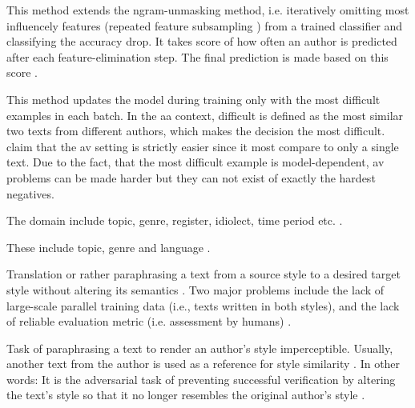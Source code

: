 \begin{definition}
    This method extends the ngram-unmasking method, i.e. iteratively omitting most influencely features (repeated feature subsampling \cite{koppel_determining_2014})
    from a trained classifier and classifying the accuracy drop.
    It takes score of how often an author is predicted after each feature-elimination step.
    The final prediction is made based on this score \cite{tyo_state_2022}.
\end{definition}


\begin{definition}
    This method updates the model during training only with the most difficult examples in each batch.
    In the \ac{aa} context, difficult is defined as the most similar two texts from different authors, 
    which makes the decision the most difficult.
    \citet{tyo_state_2022} claim that the \ac{av} setting is strictly easier since 
    it most compare to only a single text.
    Due to the fact, that the most difficult example is model-dependent, \ac{av} problems can be made harder 
    but they can not exist of exactly the hardest negatives.
\end{definition}

\begin{definition}
    [Domain]
    The domain include topic, genre, register, idiolect, time period etc. \cite{bischoff_importance_2020}.
\end{definition}
  
\begin{definition}
    These include topic, genre and language \cite{bischoff_importance_2020}.
\end{definition}

\begin{definition}
    Translation or rather paraphrasing a text from a source style to a desired target style \cite{bischoff_importance_2020} without altering its semantics \cite{gohsen_task_oriented_2024}.
    Two major problems include the lack of large-scale parallel training data (i.e., texts written in both styles), 
    and the lack of reliable evaluation metric (i.e. assessment by humans) \cite{bischoff_importance_2020}.
\end{definition}

\begin{definition}
    Task of paraphrasing a text to render an author's style imperceptible.
    Usually, another text from the author is used as a reference for style similarity \cite{bischoff_importance_2020}.
    In other words: It is the adversarial task of preventing successful verification by altering the text's style so that 
    it no longer resembles the original author's style \cite{bevendorff_divergence_based_2020,gohsen_task_oriented_2024}.
\end{definition}

